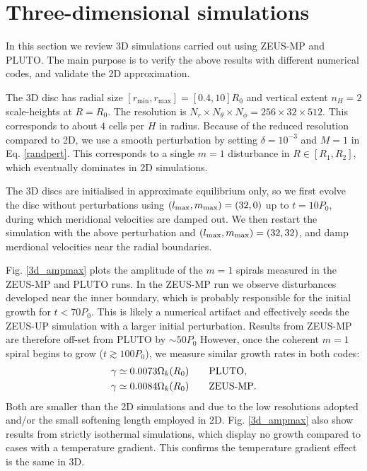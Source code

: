 \section{Three-dimensional simulations}\label{results3d}
In this section we review 3D simulations carried 
out using ZEUS-MP and PLUTO. The main purpose is to verify 
the above results with different numerical codes, and validate  
the 2D approximation.    

The 3D disc has radial size
$[r_\mathrm{min},r_\mathrm{max}]=[0.4,10]R_0$ and vertical extent  
$n_H=2$ scale-heights at $R=R_0$. The resolution is $N_r\times N_\theta\times
N_\phi=256\times32\times512$. This corresponds to about $4$ cells per
$H$ in radius. Because of the reduced resolution 
compared to 2D, we use a smooth perturbation by setting
$\delta = 10^{-3}$ and $M=1$ in Eq. \ref{randpert}. This corresponds
to a single $m=1$ disturbance in $R\in[R_1,R_2]$, which
eventually dominates in 2D simulations.  

The 3D discs are initialised in approximate equilibrium only, so we
first evolve the disc without perturbations using  
$(l_\mathrm{max},m_\mathrm{max})=(32,0)$ up to $t=10P_0$, during which 
meridional velocities are damped out. We then restart the simulation
with the above perturbation and $(l_\mathrm{max},m_\mathrm{max})=(32,32)$, and damp
merdional velocities near the radial boundaries. 

Fig. \ref{3d_ampmax} plots the amplitude of the $m=1$ spirals measured
in the ZEUS-MP and PLUTO runs.  
In the ZEUS-MP run we observe disturbances developed near
the inner boundary, which is probably responsible for the initial growth
for $t<70P_0$. This is likely a numerical artifact and effectively seeds
the ZEUS-UP simulation with a larger initial perturbation. Results
from ZEUS-MP are therefore off-set from PLUTO by $\sim50P_0$ However,
once the coherent $m=1$ spiral begins to grow ($t\gtrsim 100P_0$), 
we measure similar growth rates in both codes: 
\begin{align*}
  &\gamma \simeq 0.0073\Omega_k(R_0) \quad\quad \mathrm{PLUTO},\\
  &\gamma \simeq 0.0084\Omega_k(R_0) \quad\quad {\operatorname{ZEUS-MP}}.
\end{align*}
Both are smaller than the 2D simulations and due to the
low resolutions adopted and/or the small softening length employed in
2D.  Fig. \ref{3d_ampmax} also show results from strictly isothermal
simulations, which display no growth compared to cases with a 
temperature gradient. This confirms the temperature gradient effect is
the same in 3D. 

